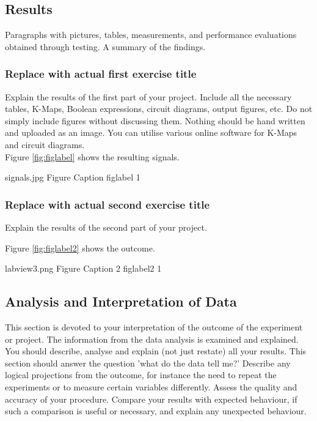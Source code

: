 \subsection{Results}
Paragraphs with pictures, tables, measurements, and performance evaluations obtained through testing. A summary of the findings. 

\subsubsection{Replace with actual first exercise title}
Explain the results of the first part of your project. Include all the necessary tables, K-Maps, Boolean expressions, circuit diagrams, output figures, etc. Do not simply include figures without discussing them. Nothing should be hand written and uploaded as an image. You can utilise various online software for K-Maps and circuit diagrams.
\\

Figure \ref{fig:figlabel} shows the resulting signals.

 \ecefigure
{signals.jpg}
{Figure Caption}
{figlabel}
{1}  
\FloatBarrier 

\subsubsection{Replace with actual second exercise title}
Explain the results of the second part of your project. 

Figure \ref{fig:figlabel2} shows the outcome.

\ecefigure
{labview3.png}
{Figure Caption 2}
{figlabel2}
{1}  


\subsection{Analysis and Interpretation of Data}
This section is devoted to your interpretation of the outcome of the experiment or project. The information from the data analysis is examined and explained. You should describe, analyse and explain (not just restate) all your results. This section should answer the question 'what do the data tell me?' Describe any logical projections from the outcome, for instance the need to repeat the experiments or to measure certain variables differently. Assess the quality and accuracy of your procedure. Compare your results with expected behaviour, if such a comparison is useful or necessary, and explain any unexpected behaviour. 




